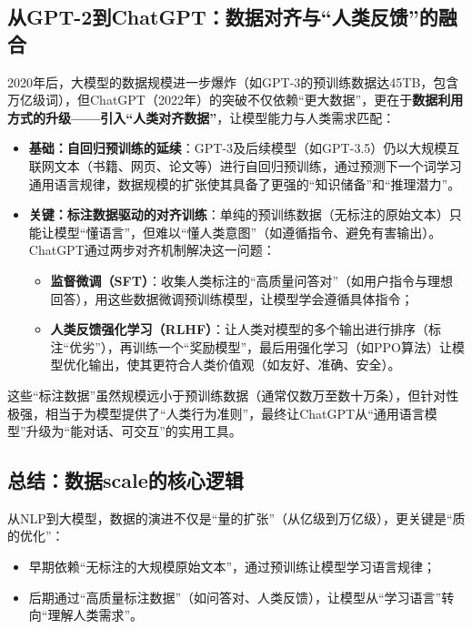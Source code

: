 \subsection{从GPT-2到ChatGPT：数据对齐与“人类反馈”的融合}

2020年后，大模型的数据规模进一步爆炸（如GPT-3的预训练数据达45TB，包含万亿级词），但ChatGPT（2022年）的突破不仅依赖“更大数据”，更在于\textbf{数据利用方式的升级——引入“人类对齐数据”}，让模型能力与人类需求匹配：

\begin{itemize}
	\item \textbf{基础：自回归预训练的延续}：GPT-3及后续模型（如GPT-3.5）仍以大规模互联网文本（书籍、网页、论文等）进行自回归预训练，通过预测下一个词学习通用语言规律，数据规模的扩张使其具备了更强的“知识储备”和“推理潜力”。
	\item \textbf{关键：标注数据驱动的对齐训练}：单纯的预训练数据（无标注的原始文本）只能让模型“懂语言”，但难以“懂人类意图”（如遵循指令、避免有害输出）。ChatGPT通过两步对齐机制解决这一问题：  
	\begin{itemize}
		\item \textbf{监督微调（SFT）}：收集人类标注的“高质量问答对”（如用户指令与理想回答），用这些数据微调预训练模型，让模型学会遵循具体指令；  
		\item \textbf{人类反馈强化学习（RLHF）}：让人类对模型的多个输出进行排序（标注“优劣”），再训练一个“奖励模型”，最后用强化学习（如PPO算法）让模型优化输出，使其更符合人类价值观（如友好、准确、安全）。  
	\end{itemize}
\end{itemize}

这些“标注数据”虽然规模远小于预训练数据（通常仅数万至数十万条），但针对性极强，相当于为模型提供了“人类行为准则”，最终让ChatGPT从“通用语言模型”升级为“能对话、可交互”的实用工具。


\subsection{总结：数据scale的核心逻辑}

从NLP到大模型，数据的演进不仅是“量的扩张”（从亿级到万亿级），更关键是“质的优化”：  

\begin{itemize}
	\item 早期依赖“无标注的大规模原始文本”，通过预训练让模型学习语言规律；  
	\item 后期通过“高质量标注数据”（如问答对、人类反馈），让模型从“学习语言”转向“理解人类需求”。  
\end{itemize}

